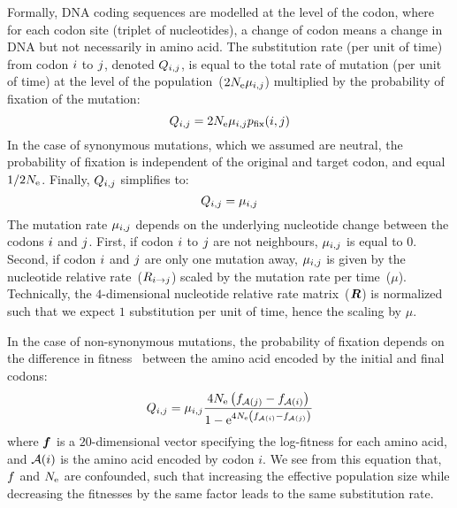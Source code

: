 Formally, DNA coding sequences are modelled at the level of the codon, where for each codon site (triplet of nucleotides), a change of codon means a change in \acrshort{DNA} but not necessarily in amino acid.
The substitution rate (per unit of time) from codon ${i}$ to ${j}$, denoted $Q_{{i}, {j}}$, is equal to the total rate of mutation (per unit of time) at the level of the population~($2N_{\mathrm{e}}\mu_{{i}, {j}}$) multiplied by the probability of fixation of the mutation:
\begin{equation}
{Q_{{i}, {j}}}
    = 2 N_{\mathrm{e}} \mu_{{i}, {j}} p_{\mathrm{fix}}({i}, {j})
\end{equation}
In the case of synonymous mutations, which we assumed are neutral, the probability of fixation is independent of the original and target codon, and equal $1/2 N_{\mathrm{e}}$.
Finally, ${Q_{{i}, {j}}}$ simplifies to:
\begin{equation}
    Q_{{i}, {j}} = \mu_{{i}, {j}}
\end{equation}
The mutation rate $\mu_{{i}, {j}}$ depends on the underlying nucleotide change between the codons ${i}$ and ${j}$.
First, if codon ${i}$ to ${j}$ are not neighbours, $\mu_{{i}, {j}}$ is equal to $0$.
Second, if codon ${i}$ and ${j}$ are only one mutation away, $\mu_{{i}, {j}}$ is given by the nucleotide relative rate~(${R_{{i} \rightarrow {j}}}$) scaled by the mutation rate per time~($\mu$).
Technically, the $4$-dimensional nucleotide relative rate matrix~($\bm{R}$) is normalized such that we expect $1$ substitution per unit of time, hence the scaling by $\mu$.

In the case of non-synonymous mutations, the probability of fixation depends on the difference in fitness~\citep{Ohta1992} between the amino acid encoded by the initial and final codons:
\begin{equation}
    \label{eq:mutationSelection}
    {\submatrix_{\itoj}} = \mu_{\itoj} \dfrac{4 \Ne \left({\fitj - \fiti}\right)}{{1 - \e^{4 \Ne \left({\fiti - \fitj}\right)} }}
\end{equation}
where $\bm{f}$ is a $20$-dimensional vector specifying the log-fitness for each amino acid, and $\mathcal{A}({i})$ is the amino acid encoded by codon $i$.
We see from this equation that, $f$ and $N_{\mathrm{e}}$ are confounded, such that increasing the effective population size while decreasing the fitnesses by the same factor leads to the same substitution rate.

